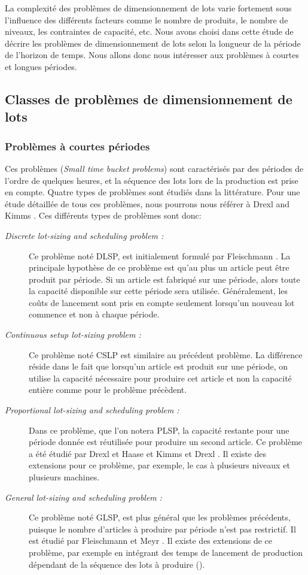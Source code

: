 	La complexité des problèmes de dimensionnement de lots varie fortement sous l'influence des différents facteurs comme le nombre de produits, le nombre de niveaux, les contraintes de capacité, etc. Nous avons choisi dans cette étude de décrire les problèmes de dimensionnement de lots selon la longueur de la période de l'horizon de temps. Nous allons donc nous intéresser aux problèmes à courtes et longues périodes.
\subsection{Classes de problèmes de dimensionnement de lots}
	\subsubsection{Problèmes à courtes périodes}
	Ces problèmes (\emph{Small time bucket problems}) sont caractérisés par des périodes de l'ordre de quelques heures, et la séquence des lots lors de la production est prise en compte. Quatre types de problèmes sont étudiés dans la littérature. Pour une étude détaillée de tous ces problèmes, nous pourrons nous référer à Drexl and Kimms \cite{drexl_kimms}. Ces différents types de problèmes sont donc:
	\begin{description}
		\item[\textsl{Discrete lot-sizing and scheduling problem :}]
		Ce problème noté DLSP, est initialement formulé par Fleischmann \cite{fleischmann}. La principale hypothèse de ce problème est qu'au plus un article peut être produit par
période. Si un article est fabriqué sur une période, alors toute la capacité disponible sur cette période sera utilisée. Généralement, les coûts de lancement sont pris en compte seulement lorsqu'un nouveau lot commence et non à chaque période.
		\item[\textsl{Continuous setup lot-sizing problem :}]
		Ce problème noté CSLP est similaire au précédent problème. La différence réside dans le fait que lorsqu'un article est produit sur une période, on utilise la capacité nécessaire pour produire cet article et non la capacité entière comme pour le problème précèdent.
		\item[\textsl{Proportional lot-sizing and scheduling problem : }] 
		Dans ce problème, que l'on notera PLSP, la capacité restante pour une période donnée est réutilisée pour produire un second article. Ce problème a été étudié par Drexl et Haase \cite{drexl_haase} et Kimms et Drexl \cite{drexl_kimms}. Il existe des extensions pour ce problème, par exemple, le cas à plusieurs niveaux et plusieurs machines. 
		\item[\textsl{General lot-sizing and scheduling problem : }] 
		Ce problème noté GLSP, est plus général que les problèmes précédents, puisque le nombre d'articles à produire par période n'est pas restrictif. Il est étudié par Fleischmann et Meyr \cite{fleischmann_meyr}. Il existe des extensions de ce problème, par exemple en intégrant des temps de lancement de production dépendant de la séquence des lots à produire (\cite{meyr}).
	\end{description}
	
